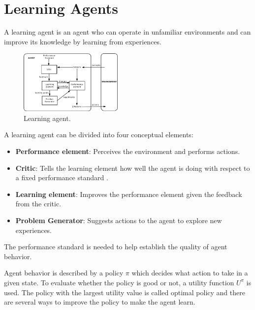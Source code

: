 \section{Learning Agents}
\label{sec:learning-agents}
A learning agent is an agent who can operate in unfamiliar environments and can improve its knowledge by learning from experiences.

\begin{figure}[ht]
    \centering
    \includegraphics[width=0.45\textwidth]{images/IntelligentAgent-Learning.png}
    \caption{Learning agent.}
\end{figure}

\noindent
A learning agent can be divided into four conceptual elements:
\begin{itemize}
    \item \textbf{Performance element}: Perceives the environment and performs actions.
    \item \textbf{Critic}: Tells the learning element how well the agent is doing with respect to a fixed performance standard \cite{russell2002artificial}.
    \item \textbf{Learning element}: Improves the performance element given the feedback from the critic.
    \item \textbf{Problem Generator}: Suggests actions to the agent to explore new experiences.
\end{itemize}
The performance standard is needed to help establish the quality of agent behavior.

Agent behavior is described by a policy $\pi$ which decides what action to take in a given state.
To evaluate whether the policy is good or not, a utility function $U^{\pi}$ is used.
The policy with the largest utility value is called optimal policy and there are several ways to improve the policy to make the agent learn.
